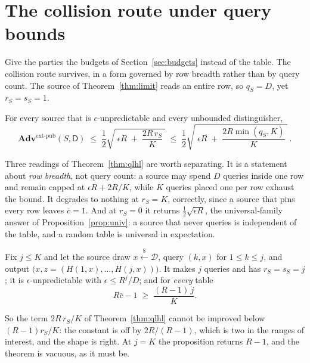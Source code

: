 \documentclass{aicr-solution}
\newcommand{\Adv}{\mathbf{Adv}}
\newcommand{\extp}{\mathrm{ext}\text{-}\mathrm{pub}}
\renewcommand{\sample}{\stackrel{{\scriptscriptstyle\$}}{\leftarrow}}
\newcommand{\calD}{\mathcal{D}}
\begin{document}
\section{The collision route under query bounds}\label{sec:rowbreadth}

Give the parties the budgets of Section~\ref{sec:budgets} instead of the table. The collision route
survives, in a form governed by row breadth rather than by query count. The source of
Theorem~\ref{thm:limit} reads an entire row, so $q_S = D$, yet $r_S = s_S = 1$.
\begin{theorem}\label{thm:qlhl}
For every source that is $\epsilon$-unpredictable and every unbounded distinguisher,
\[
  \Adv^{\extp}(S,\mathsf{D}) \;\le\; \frac12\sqrt{\;\epsilon R \;+\; \frac{2R\,r_S}{K}\;}
  \;\le\; \frac12\sqrt{\;\epsilon R \;+\; \frac{2R\min(q_S,K)}{K}\;} \, .
\]
\end{theorem}

Three readings of Theorem~\ref{thm:qlhl} are worth separating. It is a statement about \emph{row
breadth}, not query count: a source may spend $D$ queries inside one row and remain capped at
$\epsilon R + 2R/K$, while $K$ queries placed one per row exhaust the bound. It degrades to nothing
at $r_S = K$, correctly, since a source that pins every row leaves $\bar c = 1$. And at $r_S = 0$ it
returns $\tfrac12\sqrt{\epsilon R}$, the universal-family answer of
Proposition~\ref{prop:univ}: a source that never queries is independent of the table, and a random
table is universal in expectation.

\begin{proposition}\label{prop:qtight}
Fix $j \le K$ and let the source draw $x \sample \calD$, query $(k,x)$ for $1 \le k \le j$, and output
$\bigl(x, z = (H(1,x),\dots,H(j,x))\bigr)$. It makes $j$ queries and has $r_S = s_S = j$; it is
$\epsilon$-unpredictable with $\epsilon \le R^{j}/D$; and for \emph{every} table
\[
  R\bar c - 1 \;\ge\; \frac{(R-1)\,j}{K} .
\]
\end{proposition}

So the term $2R\,r_S/K$ of Theorem~\ref{thm:qlhl} cannot be improved below $(R-1)r_S/K$: the
constant is off by $2R/(R-1)$, which is two in the ranges of interest, and the shape is right. At $j = K$ the proposition
returns $R - 1$, and the theorem is vacuous, as it must be.
\end{document}
